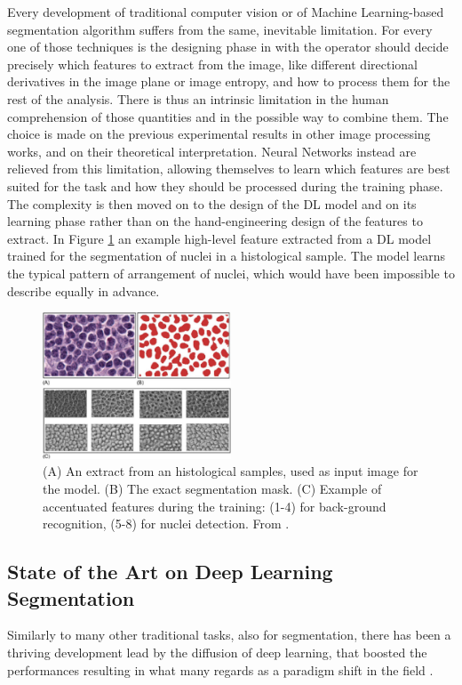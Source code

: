 \documentclass[12pt,a4paper]{report}
\begin{document}
Every development of traditional computer vision or of Machine Learning-based segmentation algorithm suffers from the same, inevitable limitation. For every one of those techniques is the designing phase in with the operator should decide precisely which features to extract from the image, like different directional derivatives in the image plane or image entropy, and how to process them for the rest of the analysis. There is thus an intrinsic limitation in the human comprehension of those quantities and in the possible way to combine them. The choice is made on the previous experimental results in other image processing works, and on their theoretical interpretation. Neural Networks instead are relieved from this limitation, allowing themselves to learn which features are best suited for the task and how they should be processed during the training phase. The complexity is then moved on to the design of the DL model and on its learning phase rather than on the hand-engineering design of the features to extract. In Figure \ref{fig:nuclei_feature} an example high-level feature extracted from a DL model trained for the segmentation of nuclei in a histological sample. The model learns the typical pattern of arrangement of nuclei, which would have been impossible to describe equally in advance.

\begin{figure}
    \centering
    \includegraphics[width = 0.5\textwidth]{images/nuclei_feature}
    \caption{(A) An extract from an histological samples, used as input image for the model. (B) The exact segmentation mask. (C)
    Example of accentuated features during the training: (1-4) for back-ground recognition, (5-8) for nuclei detection. From \cite{alheejawi2020deep}.}
    \label{fig:nuclei_feature}
\end{figure}

\subsection{State of the Art on Deep Learning Segmentation} \label{ssec:soa_seg}
Similarly to many other traditional tasks, also for segmentation, there has been a thriving development lead by the diffusion of deep learning, that boosted the performances resulting in what many regards as a paradigm shift in the field \cite{deep_seg_SOA}.
\end{document}
